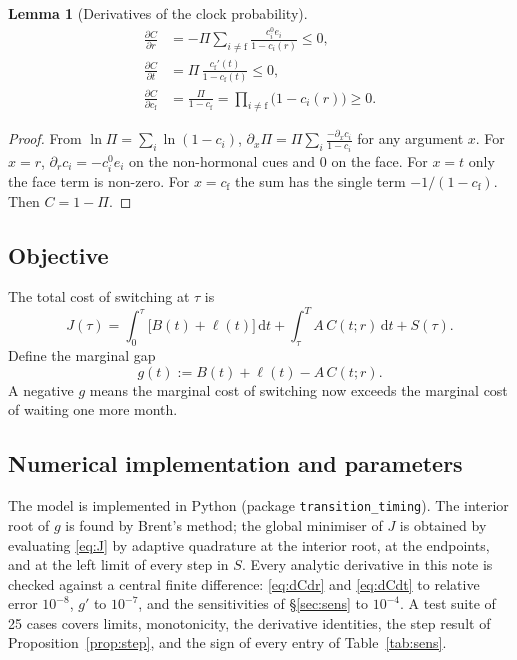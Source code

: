 \documentclass[11pt,a4paper]{article}
\newtheorem{lemma}{Lemma}
\theoremstyle{remark}
\newcommand{\dd}{\,\mathrm{d}}
\newcommand{\cface}{c_{\mathrm{f}}}
\newcommand{\pderiv}[2]{\frac{\partial #1}{\partial #2}}
\begin{document}
\begin{lemma}[Derivatives of the clock probability]\label{lem:dC}
\begin{align}
  \pderiv{C}{r} &= -\Pi\sum_{i\ne\mathrm{f}}\frac{c_i^0 e_i}{1-c_i(r)} \le 0, \label{eq:dCdr}\\
  \pderiv{C}{t} &= \Pi\,\frac{\cface'(t)}{1-\cface(t)} \le 0, \label{eq:dCdt}\\
  \pderiv{C}{\cface} &= \frac{\Pi}{1-\cface} = \prod_{i\ne\mathrm{f}}\bigl(1-c_i(r)\bigr) \ge 0. \label{eq:dCdcf}
\end{align}
\end{lemma}
\begin{proof}
From $\ln\Pi=\sum_i\ln(1-c_i)$, $\partial_x\Pi = \Pi\sum_i\frac{-\partial_x c_i}{1-c_i}$ for any argument $x$. For $x=r$, $\partial_r c_i=-c_i^0 e_i$ on the non-hormonal cues and $0$ on the face. For $x=t$ only the face term is non-zero. For $x=\cface$ the sum has the single term $-1/(1-\cface)$. Then $C=1-\Pi$.
\end{proof}

\subsection{Objective}

The total cost of switching at $\tau$ is
\begin{equation}
  J(\tau) = \int_0^{\tau}\bigl[B(t)+\ell(t)\bigr]\dd t + \int_{\tau}^{T} A\,C(t;r)\dd t + S(\tau). \label{eq:J}
\end{equation}
Define the marginal gap
\begin{equation}
  g(t) := B(t)+\ell(t)-A\,C(t;r). \label{eq:g}
\end{equation}
A negative $g$ means the marginal cost of switching now exceeds the marginal cost of waiting one more month.

\subsection{Numerical implementation and parameters}
\label{sec:numerics}

The model is implemented in Python (package \texttt{transition\_timing}). The interior root of $g$ is found by Brent's method; the global minimiser of $J$ is obtained by evaluating \eqref{eq:J} by adaptive quadrature at the interior root, at the endpoints, and at the left limit of every step in $S$. Every analytic derivative in this note is checked against a central finite difference: \eqref{eq:dCdr} and \eqref{eq:dCdt} to relative error $10^{-8}$, $g'$ to $10^{-7}$, and the sensitivities of \S\ref{sec:sens} to $10^{-4}$. A test suite of 25 cases covers limits, monotonicity, the derivative identities, the step result of Proposition~\ref{prop:step}, and the sign of every entry of Table~\ref{tab:sens}.
\end{document}
